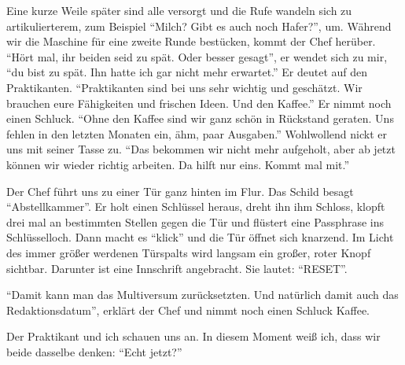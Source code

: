\documentclass[final]{multiversum}
\begin{document}
Eine kurze Weile später sind alle versorgt und die Rufe wandeln sich zu artikulierterem, zum Beispiel \enquote{Milch? Gibt es auch noch Hafer?}, um.
Während wir die Maschine für eine zweite Runde bestücken, kommt der Chef herüber.
\enquote{Hört mal, ihr beiden seid zu spät. Oder besser gesagt}, er wendet sich zu mir, \enquote{du bist zu spät.
Ihn hatte ich gar nicht mehr erwartet.}
Er deutet auf den Praktikanten.
\enquote{Praktikanten sind bei uns sehr wichtig und geschätzt.
Wir brauchen eure Fähigkeiten und frischen Ideen. 
Und den Kaffee.}
Er nimmt noch einen Schluck.
\enquote{Ohne den Kaffee sind wir ganz schön in Rückstand geraten. 
Uns fehlen in den letzten Monaten ein, ähm, paar Ausgaben.}
Wohlwollend nickt er uns mit seiner Tasse zu.
\enquote{Das bekommen wir nicht mehr aufgeholt, aber ab jetzt können wir wieder richtig arbeiten.
Da hilft nur eins. 
Kommt mal mit.}

Der Chef führt uns zu einer Tür ganz hinten im Flur. 
Das Schild besagt \enquote{Abstellkammer}.
Er holt einen Schlüssel heraus, dreht ihn ihm Schloss, klopft drei mal an bestimmten Stellen gegen die Tür und flüstert eine Passphrase ins Schlüsselloch.
Dann macht es \enquote{klick} und die Tür öffnet sich knarzend.
Im Licht des immer größer werdenen Türspalts wird langsam ein großer, roter Knopf sichtbar.
Darunter ist eine Innschrift angebracht.
Sie lautet: \enquote{RESET}.

\enquote{Damit kann man das Multiversum zurücksetzten.
Und natürlich damit auch das Redaktionsdatum}, erklärt der Chef und nimmt noch einen Schluck Kaffee.

Der Praktikant und ich schauen uns an.
In diesem Moment weiß ich, dass wir beide dasselbe denken:
\enquote{Echt jetzt?}




\end{document}
